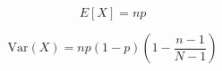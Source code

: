 \documentclass{article}
\begin{document}
\[
E[X] = np
\]

\[
\text{Var}(X) = np(1 - p) \left(1 - \frac{n - 1}{N - 1}\right)
\]
\end{document}
